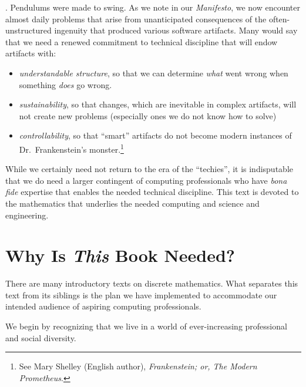 \medskip

.
Pendulums were made to swing.  As we note in our {\it Manifesto}, we now encounter almost daily problems that arise from unanticipated consequences of the often-unstructured ingenuity that produced various software artifacts.  Many would say that we need a renewed commitment to technical discipline that will endow artifacts with:
\begin{itemize}
\item
{\em understandable structure}, so that we can determine {\em what} went wrong when something {\em does} go wrong.
\medskip\item
{\em sustainability}, so that changes, which are inevitable in complex artifacts, will not create new problems (especially ones we do not know how to solve)
\medskip\item
{\em controllability}, so that ``smart'' artifacts do not become modern instances of Dr.~Frankenstein's monster.\footnote{See Mary Shelley (English author), {\it Frankenstein; or, The Modern Prometheus}.}
\end{itemize}
While we certainly need not return to the era of the ``techies'', it is indisputable that we do need a larger contingent of computing professionals who have {\em bona fide} expertise that enables the needed technical discipline.  This text is devoted to the mathematics that underlies the needed computing and science and engineering.


\section{Why Is {\em This} Book Needed?}
\label{sec:thisbookneed}

There are many introductory texts on discrete mathematics.  What separates this text from its siblings is the plan we have implemented to accommodate our intended audience of aspiring computing professionals.

\smallskip

We begin by recognizing that we live in a world of ever-increasing professional and social diversity.

\medskip

